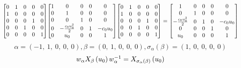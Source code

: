 \documentclass[11pt]{article}
\theoremstyle{definition}
\begin{document}
\[
\scaletoalign{\textwidth}{{\left[\begin{matrix}0 & 1 & 0 & 0 & 0\\1 & 0 & 0 & 0 & 0\\0 & 0 & 0 & 1 & 0\\0 & 0 & 1 & 0 & 0\\0 & 0 & 0 & 0 & 1\end{matrix}\right]} {\left[\begin{matrix}1 & 0 & 0 & 0 & 0\\0 & 1 & 0 & 0 & 0\\0 & 0 & 1 & 0 & 0\\0 & - \frac{c_{0} u_{0}^{2}}{2} & 0 & 1 & - c_{0} u_{0}\\0 & u_{0} & 0 & 0 & 1\end{matrix}\right]} {\left[\begin{matrix}0 & 1 & 0 & 0 & 0\\1 & 0 & 0 & 0 & 0\\0 & 0 & 0 & 1 & 0\\0 & 0 & 1 & 0 & 0\\0 & 0 & 0 & 0 & 1\end{matrix}\right]} = {\left[\begin{matrix}1 & 0 & 0 & 0 & 0\\0 & 1 & 0 & 0 & 0\\- \frac{c_{0} u_{0}^{2}}{2} & 0 & 1 & 0 & - c_{0} u_{0}\\0 & 0 & 0 & 1 & 0\\u_{0} & 0 & 0 & 0 & 1\end{matrix}\right]}}
\]
\[
\alpha = \left( -1, \  1, \  0, \  0, \  0\right), \beta = \left( 0, \  1, \  0, \  0, \  0\right), \sigma_{\alpha}(\beta) = \left( 1, \  0, \  0, \  0, \  0\right)
\]
\[
\scaletoalign{\textwidth}{w_{\alpha} X_{\beta}\left(u_{0}\right) w_{\alpha}^{-1} = X_{\sigma_{\alpha}\left(\beta\right)}\left(u_{0}\right)}
\]
\end{document}
